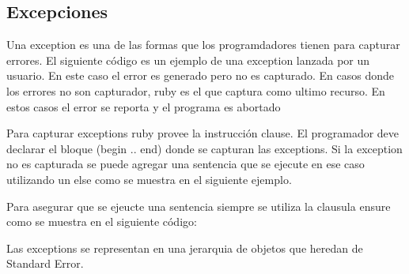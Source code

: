 \documentclass{article}
\begin{document}
 

 

 

 
\bigskip



\subsection{Excepciones}

Una exception es una de las formas que los programdadores tienen para capturar errores. 
El siguiente código es un ejemplo de una exception lanzada por un usuario. En este caso el error es generado pero no es capturado. En casos donde los errores no son capturador, ruby es el que captura como ultimo recurso. En estos casos el error se reporta y el programa es abortado

 
\bigskip

Para capturar exceptions ruby provee la instrucción clause. El programador deve declarar el bloque (begin .. end) donde se capturan las exceptions. Si la exception no es capturada se puede agregar una sentencia que se ejecute en ese caso utilizando un else como se muestra en el siguiente ejemplo. 

 
\bigskip

Para asegurar que se ejeucte una sentencia siempre se utiliza la clausula ensure como se muestra en el siguiente código:

 
\bigskip

Las exceptions se representan en una jerarquia de objetos que heredan de Standard Error. 
\bigskip
\end{document}
